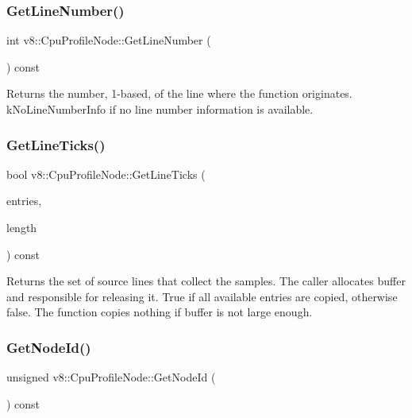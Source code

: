 \subsubsection{\texorpdfstring{Get\+Line\+Number()}{GetLineNumber()}}
{\footnotesize\ttfamily int v8\+::\+Cpu\+Profile\+Node\+::\+Get\+Line\+Number (\begin{DoxyParamCaption}{ }\end{DoxyParamCaption}) const}

Returns the number, 1-\/based, of the line where the function originates. k\+No\+Line\+Number\+Info if no line number information is available. \mbox{\label{classv8_1_1CpuProfileNode_a3a05d924e53c241225b9d3bf61af05db}} 
\subsubsection{\texorpdfstring{Get\+Line\+Ticks()}{GetLineTicks()}}
{\footnotesize\ttfamily bool v8\+::\+Cpu\+Profile\+Node\+::\+Get\+Line\+Ticks (\begin{DoxyParamCaption}\item[{\mbox{\hyperlink{structv8_1_1CpuProfileNode_1_1LineTick}{Line\+Tick}} $\ast$}]{entries,  }\item[{unsigned int}]{length }\end{DoxyParamCaption}) const}

Returns the set of source lines that collect the samples. The caller allocates buffer and responsible for releasing it. True if all available entries are copied, otherwise false. The function copies nothing if buffer is not large enough. \mbox{\label{classv8_1_1CpuProfileNode_a67334450071a60ec3c3cfa58777cc006}} 
\subsubsection{\texorpdfstring{Get\+Node\+Id()}{GetNodeId()}}
{\footnotesize\ttfamily unsigned v8\+::\+Cpu\+Profile\+Node\+::\+Get\+Node\+Id (\begin{DoxyParamCaption}{ }\end{DoxyParamCaption}) const}

